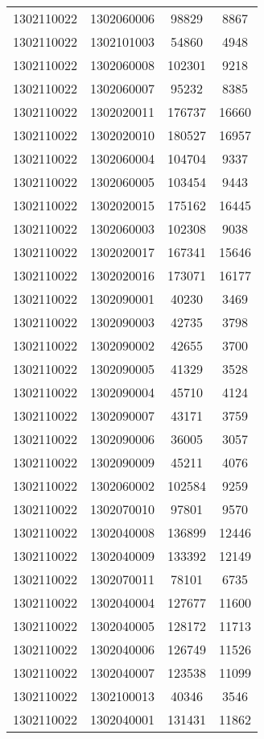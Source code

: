 \begin{longtable}[h]{llcc}
		1302110022 & 1302060006 & 98829 & 8867\\
		1302110022 & 1302101003 & 54860 & 4948\\
		1302110022 & 1302060008 & 102301 & 9218\\
		1302110022 & 1302060007 & 95232 & 8385\\
		1302110022 & 1302020011 & 176737 & 16660\\
		1302110022 & 1302020010 & 180527 & 16957\\
		1302110022 & 1302060004 & 104704 & 9337\\
		1302110022 & 1302060005 & 103454 & 9443\\
		1302110022 & 1302020015 & 175162 & 16445\\
		1302110022 & 1302060003 & 102308 & 9038\\
		1302110022 & 1302020017 & 167341 & 15646\\
		1302110022 & 1302020016 & 173071 & 16177\\
		1302110022 & 1302090001 & 40230 & 3469\\
		1302110022 & 1302090003 & 42735 & 3798\\
		1302110022 & 1302090002 & 42655 & 3700\\
		1302110022 & 1302090005 & 41329 & 3528\\
		1302110022 & 1302090004 & 45710 & 4124\\
		1302110022 & 1302090007 & 43171 & 3759\\
		1302110022 & 1302090006 & 36005 & 3057\\
		1302110022 & 1302090009 & 45211 & 4076\\
		1302110022 & 1302060002 & 102584 & 9259\\
		1302110022 & 1302070010 & 97801 & 9570\\
		1302110022 & 1302040008 & 136899 & 12446\\
		1302110022 & 1302040009 & 133392 & 12149\\
		1302110022 & 1302070011 & 78101 & 6735\\
		1302110022 & 1302040004 & 127677 & 11600\\
		1302110022 & 1302040005 & 128172 & 11713\\
		1302110022 & 1302040006 & 126749 & 11526\\
		1302110022 & 1302040007 & 123538 & 11099\\
		1302110022 & 1302100013 & 40346 & 3546\\
		1302110022 & 1302040001 & 131431 & 11862\\

\end{longtable}
